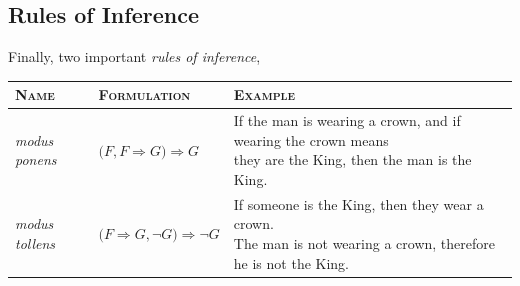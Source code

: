 \documentclass[letterpaper,twoside]{article}
\begin{document}
\begin{multicols}{2}



\subsection{Rules of Inference}

Finally, two important \textit{rules of inference},
\end{multicols}
\begin{table}[H]
    \centering
    \footnotesize
    \begin{tabular}{lll}
        \textsc{Name} & \textsc{Formulation} & \textsc{Example}\\
        \hline
        \textit{modus ponens} & $\bigg(F, F \Longrightarrow G \bigg) \Longrightarrow G$ & \makecell[l]{If the man is wearing a crown, and if wearing the crown means\\they are the King, then the man is the King.}\
        \\
        \textit{modus tollens} & $\bigg(F \Longrightarrow G, \lnot G \bigg) \Longrightarrow \lnot G$ & \makecell[l]{If someone is the King, then they wear a crown.\\The man is not wearing a crown, therefore he is not the King.}\\
    \end{tabular}
    \normalsize
\end{table}
\end{document}
